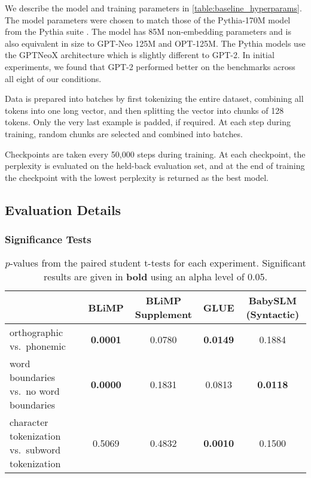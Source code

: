 We describe the model and training parameters in \cref{table:baseline_hyperparams}. The model parameters were chosen to match those of the Pythia-170M model from the Pythia suite \citep{biderman2023pythia}. The model has 85M non-embedding parameters and is also equivalent in size to GPT-Neo 125M and OPT-125M. The Pythia models use the GPTNeoX architecture which is slightly different to GPT-2. In initial experiments, we found that GPT-2 performed better on the benchmarks across all eight of our conditions. 

Data is prepared into batches by first tokenizing the entire dataset, combining all tokens into one long vector, and then splitting the vector into chunks of 128 tokens. Only the very last example is padded, if required. At each step during training, random chunks are selected and combined into batches. 

Checkpoints are taken every 50,000 steps during training. At each checkpoint, the perplexity is evaluated on the held-back evaluation set, and at the end of training the checkpoint with the lowest perplexity is returned as the best model. 

\subsection{Evaluation Details}

\subsubsection{Significance Tests}
\label{sec:significance}

\begin{table*}[t]
    \centering
    \small
    \begin{tabular}{l|cccc}
     & BLiMP&BLiMP Supplement & GLUE & BabySLM (Syntactic) \\
\hline
orthographic vs.\ phonemic & \textbf{0.0001} & 0.0780 & \textbf{0.0149} & 0.1884 \\
word boundaries vs.\ no word boundaries & \textbf{0.0000} & 0.1831 & 0.0813 & \textbf{0.0118} \\
character tokenization vs.\ subword tokenization & 0.5069 & 0.4832 & \textbf{0.0010} & 0.1500 \\
    \end{tabular}
    \caption{$p$-values from the paired student t-tests for each experiment. Significant results are given in \textbf{bold} using an alpha level of 0.05.}
    \label{tab:pvalues}
\end{table*}



